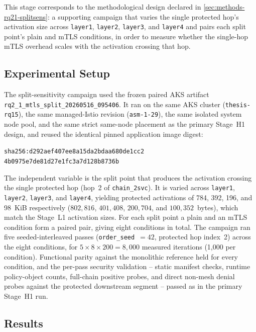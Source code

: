 This stage corresponds to the methodological design declared in
\cref{sec:methods-rq21-splitsens}: a supporting campaign that varies the
single protected hop's activation size across \texttt{layer1},
\texttt{layer2}, \texttt{layer3}, and \texttt{layer4} and pairs each split
point's plain and mTLS conditions, in order to measure whether the
single-hop mTLS overhead scales with the activation crossing that hop.

\subsection{Experimental Setup}

The split-sensitivity campaign used the frozen paired AKS artifact
\texttt{rq2\_1\_mtls\_split\_20260516\_095406}. It ran on the same AKS cluster
(\texttt{thesis-rq15}), the same managed-Istio revision (\texttt{asm-1-29}), the
same isolated system node pool, and the same strict same-node placement as the
primary Stage~H1 design, and reused the identical pinned application image
digest:
\begin{center}
\small\texttt{sha256:d292aef407ee8a15da2bdaa680de1cc2}\\
\small\texttt{4b0975e7de81d27e1fc3a7d128b8736b}
\end{center}
The independent variable is the split point that produces the activation crossing
the single protected hop (hop~2 of \texttt{chain\_2svc}). It is varied across
\texttt{layer1}, \texttt{layer2}, \texttt{layer3}, and \texttt{layer4}, yielding
protected activations of 784, 392, 196, and 98~KiB respectively
($802{,}816$, $401{,}408$, $200{,}704$, and $100{,}352$~bytes), which match the
Stage~L1 activation sizes. For each split point a plain and an mTLS condition form
a paired pair, giving eight conditions in total. The campaign ran five
seeded-interleaved passes (\texttt{order\_seed}~$=42$, protected hop index~2)
across the eight conditions, for $5 \times 8 \times 200 = 8{,}000$ measured
iterations (1{,}000 per condition). Functional parity against the monolithic
reference held for every condition, and the per-pass security validation --
static manifest checks, runtime policy-object counts, full-chain positive probes,
and direct non-mesh denial probes against the protected downstream segment --
passed as in the primary Stage~H1 run.

\subsection{Results}

